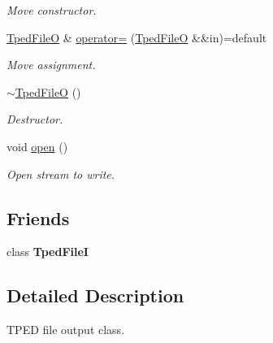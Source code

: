 \begin{DoxyCompactItemize}
\begin{DoxyCompactList}\small\item\em Move constructor. \end{DoxyCompactList}\item 
\mbox{\label{classvarfiles_1_1_tped_file_o_a52abdba4550603dce7decff0674354ef}} 
\hyperlink{classvarfiles_1_1_tped_file_o}{Tped\+FileO} \& \hyperlink{classvarfiles_1_1_tped_file_o_a52abdba4550603dce7decff0674354ef}{operator=} (\hyperlink{classvarfiles_1_1_tped_file_o}{Tped\+FileO} \&\&in)=default
\begin{DoxyCompactList}\small\item\em Move assignment. \end{DoxyCompactList}\item 
\mbox{\label{classvarfiles_1_1_tped_file_o_ac501e5644e419b8ac99987f4f0a99840}} 
\hyperlink{classvarfiles_1_1_tped_file_o_ac501e5644e419b8ac99987f4f0a99840}{$\sim$\+Tped\+FileO} ()
\begin{DoxyCompactList}\small\item\em Destructor. \end{DoxyCompactList}\item 
\mbox{\label{classvarfiles_1_1_tped_file_o_a51ebb1d2bfe493583ed7c5b511b238b1}} 
void \hyperlink{classvarfiles_1_1_tped_file_o_a51ebb1d2bfe493583ed7c5b511b238b1}{open} ()
\begin{DoxyCompactList}\small\item\em Open stream to write. \end{DoxyCompactList}\end{DoxyCompactItemize}
\subsection*{Friends}
\begin{DoxyCompactItemize}
\item 
\mbox{\label{classvarfiles_1_1_tped_file_o_aeb47e2986d7ad000d56308d882625f34}} 
class {\bfseries Tped\+FileI}
\end{DoxyCompactItemize}


\subsection{Detailed Description}
T\+P\+ED file output class. 

